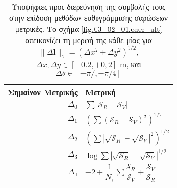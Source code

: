 \begin{table}\centering
  \renewcommand{\arraystretch}{1.5}
  \begin{tabular}{r|l}                                                                                                         \toprule
  Σημαίνον Μετρικής & Μετρική                                                                                               \\ \midrule
  $\Delta_0$        & $\sum |\mathcal{S}_R-\mathcal{S}_V|$                                                                  \\
  $\Delta_1$        & $(\sum (\mathcal{S}_R-\mathcal{S}_V)^2)^{1/2}$                                                        \\
  $\Delta_2$        & $(\sum |\sqrt{\mathcal{S}_R}-\sqrt{\mathcal{S}_V}|^2)^{1/2}$                                          \\
  $\Delta_3$        & $\log\sum |\sqrt{\mathcal{S}_R}-\sqrt{\mathcal{S}_V}|^{1/2}$                                          \\
  $\Delta_4$        & $-2 + \dfrac{1}{N_s}\sum \dfrac{\mathcal{S}_R}{\mathcal{S}_V} + \dfrac{\mathcal{S}_V}{\mathcal{S}_R}$ \\ \bottomrule
  \end{tabular}
  \caption{\small Υποψήφιες προς διερεύνηση της συμβολής τους στην επίδοση
           μεθόδων ευθυγράμμισης σαρώσεων μετρικές. Το σχήμα
           \ref{fig:03_02_01:caer_alt} απεικονίζει τη μορφή της κάθε μίας για
           $\|\Delta \bm{l}\|_2 = (\Delta x^2 + \Delta y^2)^{1/2}$,
           $\Delta x, \Delta y \in [-0.2, +0,2]$ m, και
           $\Delta \theta \in [-\pi/, +\pi/4]$}
  \label{tbl:03_02_01:caer_alt}
\end{table}
